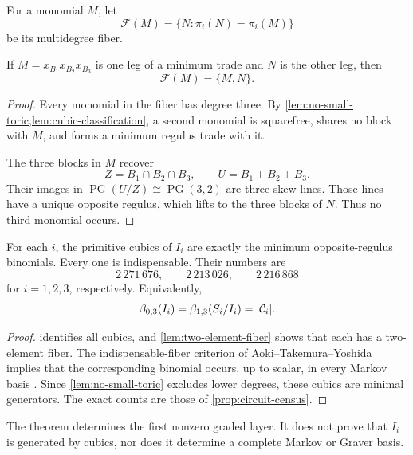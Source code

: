 For a monomial \(M\), let
\[
 \mathcal F(M)=\{N:\pi_i(N)=\pi_i(M)\}
\]
be its multidegree fiber.

\begin{lemma}
\label{lem:two-element-fiber}
If \(M=x_{B_1}x_{B_2}x_{B_3}\) is one leg of a minimum trade and
\(N\) is the other leg, then
\[
 \mathcal F(M)=\{M,N\}.
\]
\end{lemma}

\begin{proof}
Every monomial in the fiber has degree three.  By
\cref{lem:no-small-toric,lem:cubic-classification}, a second monomial is
squarefree, shares no block with \(M\), and forms a minimum regulus trade
with it.

The three blocks in \(M\) recover
\[
 Z=B_1\cap B_2\cap B_3,
 \qquad
 U=B_1+B_2+B_3.
\]
Their images in \(\operatorname{PG}(U/Z)\cong\operatorname{PG}(3,2)\)
are three skew lines.  Those lines have a unique opposite regulus, which
lifts to the three blocks of \(N\).  Thus no third monomial occurs.
\end{proof}

\begin{theorem}
\label{thm:toric-cubics}
For each \(i\), the primitive cubics of \(I_i\) are exactly the minimum
opposite-regulus binomials.  Every one is indispensable.  Their numbers
are
\[
 2\,271\,676,\qquad
 2\,213\,026,\qquad
 2\,216\,868
\]
for \(i=1,2,3\), respectively.  Equivalently,
\[
 \beta_{0,3}(I_i)=\beta_{1,3}(S_i/I_i)=|\mathcal C_i|.
\]
\end{theorem}

\begin{proof}
 identifies all cubics, and
\cref{lem:two-element-fiber} shows that each has a two-element fiber.
The indispensable-fiber criterion of Aoki--Takemura--Yoshida implies that
the corresponding binomial occurs, up to scalar, in every Markov basis
\cite{AokiTakemuraYoshida}.  Since
\cref{lem:no-small-toric} excludes lower degrees, these cubics are minimal
generators.  The exact counts are those of
\cref{prop:circuit-census}.
\end{proof}

\begin{remark}
The theorem determines the first nonzero graded layer.  It does not prove
that \(I_i\) is generated by cubics, nor does it determine a complete
Markov or Graver basis.
\end{remark}
